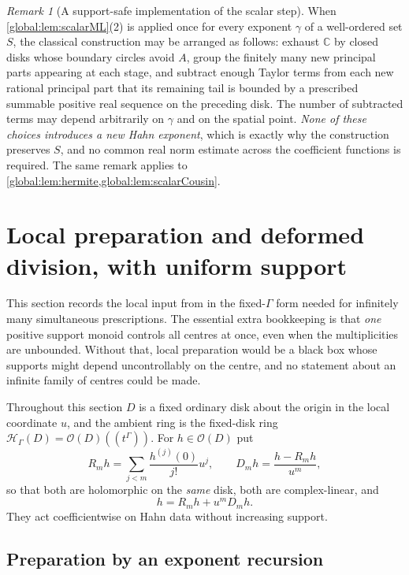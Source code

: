 \documentclass[11pt,letterpaper]{article}
\theoremstyle{definition}
\theoremstyle{remark}
\newtheorem{remark}[remark]{Remark}
\newcommand{\C}{\mathbb C}
\newcommand{\OO}{\mathcal O}
\newcommand{\HH}{\mathscr H_\Gamma}
\numberwithin{equation}{section}
\begin{document}
\begin{remark}[A support-safe implementation of the scalar step]\label{global:rem:supportsafe}
When \cref{global:lem:scalarML}(2) is applied once for every exponent $\gamma$ of a well-ordered set $S$, the classical construction may be arranged as follows: exhaust $\C$ by closed disks whose boundary circles avoid $A$, group the finitely many new principal parts appearing at each stage, and subtract enough Taylor terms from each new rational principal part that its remaining tail is bounded by a prescribed summable positive real sequence on the preceding disk. The number of subtracted terms may depend arbitrarily on $\gamma$ and on the spatial point. \emph{None of these choices introduces a new Hahn exponent}, which is exactly why the construction preserves $S$, and no common real norm estimate across the coefficient functions is required. The same remark applies to \cref{global:lem:hermite,global:lem:scalarCousin}.
\end{remark}

\section{Local preparation and deformed division, with uniform support}\label{global:sec:local}

This section records the local input from \cite{Source} in the fixed-$\Gamma$ form needed for infinitely many simultaneous prescriptions. The essential extra bookkeeping is that \emph{one} positive support monoid controls all centres at once, even when the multiplicities are unbounded. Without that, local preparation would be a black box whose supports might depend uncontrollably on the centre, and no statement about an infinite family of centres could be made.

Throughout this section $D$ is a fixed ordinary disk about the origin in the local coordinate $u$, and the ambient ring is the fixed-disk ring $\HH(D)=\OO(D)((t^\Gamma))$. For $h\in\OO(D)$ put
\[
  R_mh=\sum_{j<m}\frac{h^{(j)}(0)}{j!}u^j,
  \qquad
  D_mh=\frac{h-R_mh}{u^m},
\]
so that both are holomorphic on the \emph{same} disk, both are complex-linear, and
\begin{equation}\label{global:eq:ordinarydivision}
  h=R_mh+u^mD_mh .
\end{equation}
They act coefficientwise on Hahn data without increasing support.

\subsection{Preparation by an exponent recursion}
\end{document}
